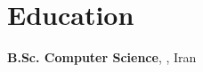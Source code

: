 \section{Education}
    \begin{onecolentry}
        \textbf{B.Sc. Computer Science}, , Iran
    \end{onecolentry}
